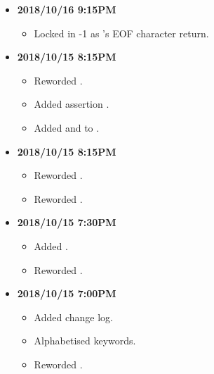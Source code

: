 \documentclass[../gazprea.tex]{subfiles}
\begin{document}
\begin{itemize}
  \item
    \textbf{2018/10/16 9:15PM}
    \begin{itemize}
      \item Locked in -1 as 's EOF character return.
    \end{itemize}
  \item
    \textbf{2018/10/15 8:15PM}
    \begin{itemize}
      \item Reworded .
      \item Added assertion .
      \item Added  and  to .
    \end{itemize}
  \item
    \textbf{2018/10/15 8:15PM}
    \begin{itemize}
      \item Reworded .
      \item Reworded .
    \end{itemize}
  \item
    \textbf{2018/10/15 7:30PM}
    \begin{itemize}
      \item Added .
      \item Reworded .
    \end{itemize}
  \item
    \textbf{2018/10/15 7:00PM}
    \begin{itemize}
      \item Added change log.
      \item Alphabetised keywords.
      \item Reworded .
    \end{itemize}
\end{itemize}
\end{document}
